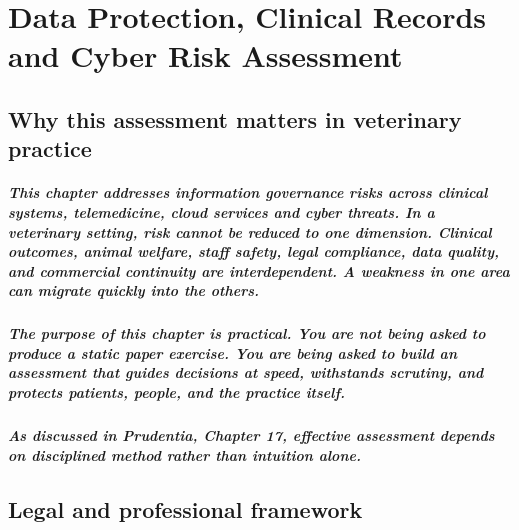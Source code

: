 \chapter{Data Protection, Clinical Records and Cyber Risk Assessment}
\label{chap:Data Protection, Clinical Records and Cyber Risk Assessment}

\section{Why this assessment matters in veterinary practice}

\paragraph{This chapter addresses information governance risks across clinical systems, telemedicine, cloud services and cyber threats. In a veterinary setting, risk cannot be reduced to one dimension. Clinical outcomes, animal welfare, staff safety, legal compliance, data quality, and commercial continuity are interdependent. A weakness in one area can migrate quickly into the others.}

\paragraph{The purpose of this chapter is practical. You are not being asked to produce a static paper exercise. You are being asked to build an assessment that guides decisions at speed, withstands scrutiny, and protects patients, people, and the practice itself.}

\paragraph{As discussed in Prudentia, Chapter 17, effective assessment depends on disciplined method rather than intuition alone.}



\section{Legal and professional framework}

